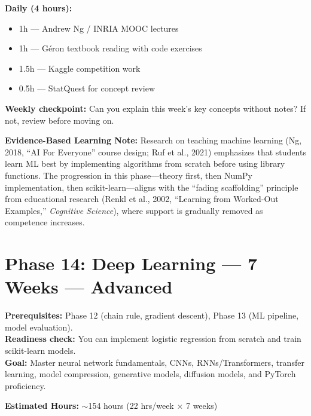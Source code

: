 \documentclass[11pt, a4paper, oneside]{report}
\begin{document}
\begin{practicebox}
\textbf{Daily (4 hours):}
\begin{itemize}[leftmargin=*]
\item 1h --- Andrew Ng / INRIA MOOC lectures
\item 1h --- G\'{e}ron textbook reading with code exercises
\item 1.5h --- Kaggle competition work
\item 0.5h --- StatQuest for concept review
\end{itemize}


\textbf{Weekly checkpoint:} Can you explain this week's key concepts without notes? If not, review before moving on.

\textbf{Evidence-Based Learning Note:} Research on teaching machine learning (Ng, 2018, ``AI For Everyone'' course design; Ruf et al., 2021) emphasizes that students learn ML best by implementing algorithms from scratch before using library functions. The progression in this phase---theory first, then NumPy implementation, then scikit-learn---aligns with the ``fading scaffolding'' principle from educational research (Renkl et al., 2002, ``Learning from Worked-Out Examples,'' \emph{Cognitive Science}), where support is gradually removed as competence increases.

\end{practicebox}

\clearpage
\section[Phase 14: Deep Learning]{Phase 14: Deep Learning --- 7 Weeks --- Advanced}

\begin{prereqbox}
\textbf{Prerequisites:} Phase 12 (chain rule, gradient descent), Phase 13 (ML pipeline, model evaluation).\\
\textbf{Readiness check:} You can implement logistic regression from scratch and train scikit-learn models.\\
\textbf{Goal:} Master neural network fundamentals, CNNs, RNNs/Transformers, transfer learning, model compression, generative models, diffusion models, and PyTorch proficiency.


\textbf{Estimated Hours:} $\sim$154 hours (22 hrs/week $\times$ 7 weeks)
\end{prereqbox}
\end{document}
